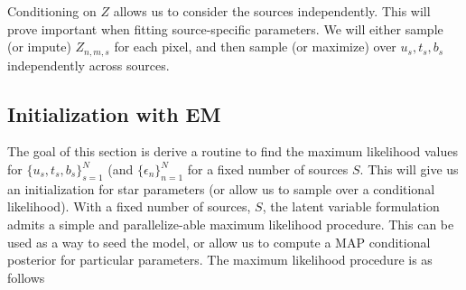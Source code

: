 \documentclass[11pt]{article}
\begin{document}
Conditioning on $Z$ allows us to consider the sources independently.  This will prove important when fitting source-specific parameters.  We will either sample (or impute) $Z_{n,m,s}$ for each pixel, and then sample (or maximize) over $u_s, t_s, b_s$ independently across sources.  

\subsection{Initialization with EM}
The goal of this section is derive a routine to find the maximum likelihood values for $\{ u_s, t_s, b_s \}_{s=1}^N$ (and $\{ \epsilon_n \}_{n=1}^N$ for a fixed number of sources $S$.  This will give us an initialization for star parameters (or allow us to sample over a conditional likelihood).  With a fixed number of sources, $S$, the latent variable formulation admits a simple and parallelize-able maximum likelihood procedure.  This can be used as a way to seed the model, or allow us to compute a MAP conditional posterior for particular parameters.  The maximum likelihood procedure is as follows
\end{document}
